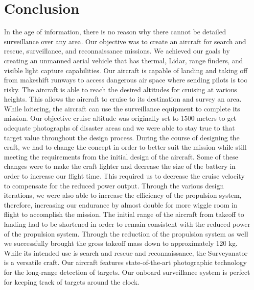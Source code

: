\documentclass[12pt,A4paper]{article}
\begin{document}
	\clearpage
	\section{Conclusion}
	\hspace{.15 in}In the age of information, there is no reason why there cannot be detailed surveillance over any area. Our objective was to create an aircraft for search and rescue, surveillance, and reconnaissance missions. We achieved our goals by creating an unmanned aerial vehicle that has thermal, Lidar, range finders, and visible light capture capabilities. Our aircraft is capable of landing and taking off from makeshift runways to access dangerous air space where sending pilots is too risky.  The aircraft is able to reach the desired altitudes for cruising at various heights. This allows the aircraft to cruise to its destination and survey an area. While loitering, the aircraft can use the surveillance equipment to complete its mission. Our objective cruise altitude was originally set to 1500 meters to get adequate photographs of disaster areas and we were able to stay true to that target value throughout the design process. During the course of designing the craft, we had to change the concept in order to better suit the mission while still meeting the requirements from the initial design of the aircraft. Some of these changes were to make the craft lighter and decrease the size of the battery in order to increase our flight time. This required us to decrease the cruise velocity to compensate for the reduced power output. Through the various design iterations, we were also able to increase the efficiency of the propulsion system, therefore, increasing our endurance by almost double for more wiggle room in flight to accomplish the mission. The initial range of the aircraft from takeoff to landing had to be shortened in order to remain consistent with the reduced power of the propulsion system. Through the reduction of the propulsion system as well we successfully brought the gross takeoff mass down to approximately 120 kg. While its intended use is search and rescue and reconnaissance, the Surveyanator is a versatile craft. Our aircraft features state-of-the-art photographic technology for the long-range detection of targets. Our onboard surveillance system is perfect for keeping track of targets around the clock.
	\clearpage
\end{document}
